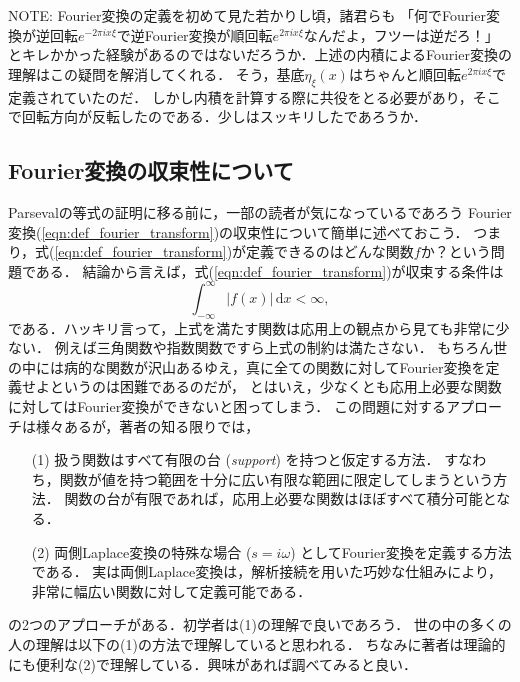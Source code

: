 \begin{displayquote}\footnotesize\textsf{NOTE:}
    Fourier変換の定義を初めて見た若かりし頃，諸君らも
    「何でFourier変換が逆回転$e^{-2\pi i x \xi}$で逆Fourier変換が順回転$e^{2\pi i x \xi}$なんだよ，フツーは逆だろ！」
    とキレかかった経験があるのではないだろうか．上述の内積によるFourier変換の理解はこの疑問を解消してくれる．
    そう，基底$\eta_{\xi}(x)$はちゃんと順回転$e^{2\pi i x \xi}$で定義されていたのだ．
    しかし内積を計算する際に共役をとる必要があり，そこで回転方向が反転したのである．少しはスッキリしたであろうか．
\end{displayquote}

\subsection*{Fourier変換の収束性について}

Parsevalの等式の証明に移る前に，一部の読者が気になっているであろう
Fourier変換(\ref{eqn:def_fourier_transform})の収束性について簡単に述べておこう．
つまり，式(\ref{eqn:def_fourier_transform})が定義できるのはどんな関数$f$か？という問題である．
結論から言えば，式(\ref{eqn:def_fourier_transform})が収束する条件は
\begin{equation}
    \int_{-\infty}^{\infty} |f(x)| \, \mathrm{d}x < \infty,
\end{equation}
である．ハッキリ言って，上式を満たす関数は応用上の観点から見ても非常に少ない．
例えば三角関数や指数関数ですら上式の制約は満たさない．
もちろん世の中には病的な関数が沢山あるゆえ，真に全ての関数に対してFourier変換を定義せよというのは困難であるのだが，
とはいえ，少なくとも応用上必要な関数に対してはFourier変換ができないと困ってしまう．
この問題に対するアプローチは様々あるが，著者の知る限りでは，
\begin{enumerate}
    \item[(1)] 扱う関数はすべて有限の台 (\textit{support}) を持つと仮定する方法．
               すなわち，関数が値を持つ範囲を十分に広い有限な範囲に限定してしまうという方法．
               関数の台が有限であれば，応用上必要な関数はほぼすべて積分可能となる．
    \item[(2)] 両側Laplace変換の特殊な場合 ($s = i\omega$) としてFourier変換を定義する方法である．
               実は両側Laplace変換は，解析接続を用いた巧妙な仕組みにより，非常に幅広い関数に対して定義可能である．
\end{enumerate}
の2つのアプローチがある．初学者は(1)の理解で良いであろう．
世の中の多くの人の理解は以下の(1)の方法で理解していると思われる．
ちなみに著者は理論的にも便利な(2)で理解している．興味があれば調べてみると良い．


